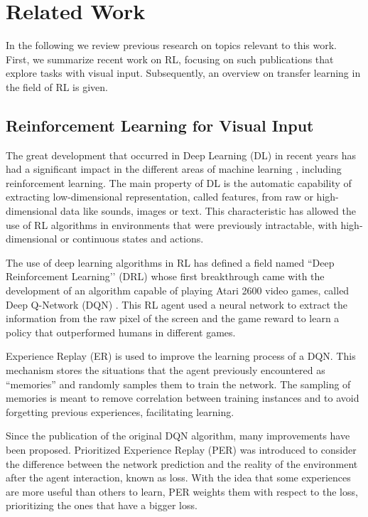 \section{Related Work}
\label{sec:related-work}

In the following we review previous research on topics relevant to this work. First, we summarize recent work on RL, focusing on such publications that explore tasks with visual input. Subsequently, an overview on transfer learning in the field of RL is given. 

\subsection{Reinforcement Learning for Visual Input}
The great development that occurred in Deep Learning (DL) in recent years has had a significant impact in the different areas of machine learning \citep{deep_learning_development}, including reinforcement learning. The main property of DL is the automatic capability of extracting low-dimensional representation, called features, from raw or high-dimensional data like sounds, images or text. This characteristic has allowed the use of RL algorithms in environments that were previously intractable, with high-dimensional or continuous states and actions.

The use of deep learning algorithms in RL has defined a field named ``Deep Reinforcement Learning’’ (DRL) whose first breakthrough came with the development of an algorithm capable of playing Atari 2600 video games, called Deep Q-Network (DQN) \citep{DQN}. This RL agent used a neural network to extract the information from the raw pixel of the screen and the game reward to learn a policy that outperformed humans in different games.

Experience Replay (ER) \citep{replay_memory_oc} is used to improve the learning process of a DQN. This mechanism stores the situations that the agent previously encountered as ``memories'' and randomly samples them to train the network. The sampling of memories is meant to remove correlation between training instances and to avoid forgetting previous experiences, facilitating learning.

Since the publication of the original DQN algorithm, many improvements have been proposed. Prioritized Experience Replay (PER) \citep{prioritized_memory} was introduced to consider the difference between the network prediction and the reality of the environment after the agent interaction, known as loss. With the idea that some experiences are more useful than others to learn, PER weights them with respect to the loss, prioritizing the ones that have a bigger loss.

